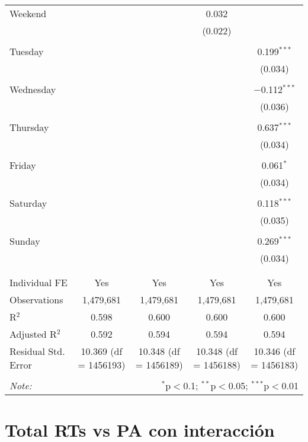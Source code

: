 \documentclass[
]{article}
\begin{document}
\begin{table}[!htbp]
{\begin{tabular}{@{\extracolsep{5pt}}lcccc}
 Weekend &  &  & 0.032 &  \\ 
  &  &  & (0.022) &  \\ 
  & & & & \\ 
 Tuesday &  &  &  & 0.199$^{***}$ \\ 
  &  &  &  & (0.034) \\ 
  & & & & \\ 
 Wednesday &  &  &  & $-$0.112$^{***}$ \\ 
  &  &  &  & (0.036) \\ 
  & & & & \\ 
 Thursday &  &  &  & 0.637$^{***}$ \\ 
  &  &  &  & (0.034) \\ 
  & & & & \\ 
 Friday &  &  &  & 0.061$^{*}$ \\ 
  &  &  &  & (0.034) \\ 
  & & & & \\ 
 Saturday &  &  &  & 0.118$^{***}$ \\ 
  &  &  &  & (0.035) \\ 
  & & & & \\ 
 Sunday &  &  &  & 0.269$^{***}$ \\ 
  &  &  &  & (0.034) \\ 
  & & & & \\ 
\hline \\[-1.8ex] 
Individual FE & Yes & Yes & Yes & Yes \\ 
Observations & 1,479,681 & 1,479,681 & 1,479,681 & 1,479,681 \\ 
R$^{2}$ & 0.598 & 0.600 & 0.600 & 0.600 \\ 
Adjusted R$^{2}$ & 0.592 & 0.594 & 0.594 & 0.594 \\ 
Residual Std. Error & 10.369 (df = 1456193) & 10.348 (df = 1456189) & 10.348 (df = 1456188) & 10.346 (df = 1456183) \\ 
\hline 
\hline \\[-1.8ex] 
\textit{Note:}  & \multicolumn{4}{r}{$^{*}$p$<$0.1; $^{**}$p$<$0.05; $^{***}$p$<$0.01} \\ 
\end{tabular}
} 
\end{table} 
\newpage
\section{Total RTs vs PA con interacción}
\end{document}
